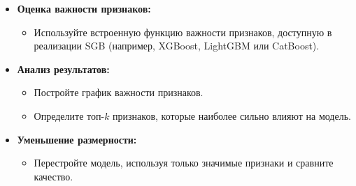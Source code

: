 \begin{itemize}
    \item \textbf{Оценка важности признаков:}
    \begin{itemize}
        \item Используйте встроенную функцию важности признаков, доступную в реализации SGB (например, XGBoost, LightGBM или CatBoost).
    \end{itemize}
    \item \textbf{Анализ результатов:}
    \begin{itemize}
        \item Постройте график важности признаков.
        \item Определите топ-$k$ признаков, которые наиболее сильно влияют на модель.
    \end{itemize}
    \item \textbf{Уменьшение размерности:}
    \begin{itemize}
        \item Перестройте модель, используя только значимые признаки и сравните качество.
    \end{itemize}
\end{itemize}